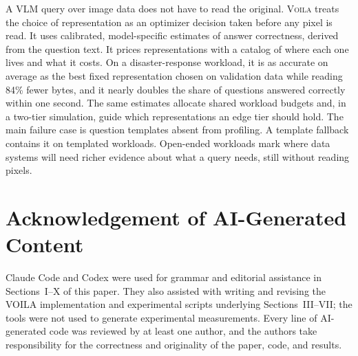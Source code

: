 \documentclass[10pt,conference]{IEEEtran}
\newcommand{\system}{\textsc{Voila}\xspace}
\begin{document}
A VLM query over image data does not have to read the original. \system treats
the choice of representation as an optimizer decision taken before any pixel is
read. It uses calibrated, model-specific estimates of answer correctness,
derived from the question text. It prices representations with a catalog of
where each one lives and what it costs. On a disaster-response workload, it is
as accurate on average as the best fixed representation chosen on validation
data while reading 84\% fewer bytes, and it nearly doubles the share of
questions answered correctly within one second. The same estimates allocate
shared workload budgets and, in a two-tier simulation, guide which
representations an edge tier should hold. The main failure case is question
templates absent from profiling. A template fallback contains it on templated
workloads. Open-ended workloads mark where data systems will need richer
evidence about what a query needs, still without reading pixels.

\section*{Acknowledgement of AI-Generated Content}
Claude Code and Codex were used for grammar and editorial assistance in
Sections~I--X of this paper. They also assisted with writing and revising the
VOILA implementation and experimental scripts underlying Sections~III--VII;
the tools were not used to generate experimental measurements. Every line of
AI-generated code was reviewed by at least one author, and the authors take
responsibility for the correctness and originality of the paper, code, and
results.



\end{document}
